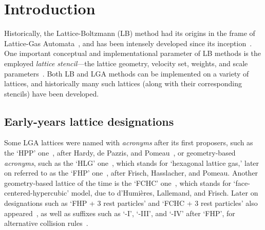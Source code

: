 \section{Introduction}

    Historically,   the   Lattice-Boltzmann   (LB)    method    had    its    origins    in    the    frame    of    Lattice-Gas
    Automata~\cite{1988-McNamaraGR+ZanettiG-PhysRevLett},     and     has     been     intensely     developed     since     its
    inception~\cite{2018-KrugerT+ViggenEM-Springer}. One important conceptual and implementational parameter of  LB  methods  is
    the    employed    \emph{lattice    stencil}---the    lattice    geometry,    velocity    set,    weights,     and     scale
    parameters~\cite{2013-HegeleJr+PhilippiPC-JSciComput,                                2013-MattilaKK+PhilippiPC-IntJModPhysC,
    2014-MattilaKK+PhilippiPC-SciWorldJ}. Both LB and LGA methods can be implemented on a variety of lattices, and  historically
    many such lattices (along with their corresponding stencils) have been developed.

    \subsection{Early-years lattice designations}

    Some   LGA   lattices   were   named   with   \emph{acronyms}   after   its   first   proposers,   such   as    the    `HPP'
    one~\cite{1986-FrischU+PomeauY-PhysRevLett},  after  Hardy,  de  Pazzis,   and   Pomeau~\cite{1973-HardyJ+PazzisO-JMathPhys,
    1976-HardyJ+PomeauY-PhysRevA,  1987-SucciS-JPhysAMathGen},  or   geometry-based   \emph{acronyms},   such   as   the   `HLG'
    one~\cite{1986-FrischU+PomeauY-PhysRevLett}, which stands for `hexagonal lattice gas,' later on referred  to  as  the  `FHP'
    one~\cite{1987-FrischU+RivetJP-ComplexSyst,  1987-SucciS-JPhysAMathGen},  after  Frisch,  Hasslacher,  and  Pomeau.  Another
    geometry-based  lattice  of  the  time  is  the  `FCHC'  one~\cite{1987-FrischU+RivetJP-ComplexSyst},   which   stands   for
    `face-centered-hypercubic' model, due to d'Humières, Lallemand, and Frisch. Later on designations such  as  `FHP  +  3  rest
    particles' and `FCHC + 3 rest particles' also appeared~\cite{1991-BoonJP-PhysD}, as well as suffixes such as  `-I',  `-III',
    and   `-IV'   after   `FHP',   for   alternative   collision   rules~\cite{1991-AppertC+ZaleskiS-PhysD,   1991-BoonJP-PhysD,
    1991-ChenS+RoseH-PhysD}.

